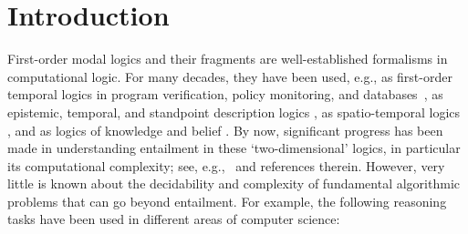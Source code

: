 \documentclass{lmcs} %
\theoremstyle{plain}\newtheorem{satz}[thm]{Satz} %
\begin{document}
\maketitle



\section{Introduction}\label{intro}

First-order modal logics and their fragments are well-established formalisms in computational logic. For many decades, they have been used, e.g., as first-order temporal logics in program verification, policy monitoring, and databases~\cite{DBLP:series/eatcs/Kroger87,DBLP:conf/cav/BasinKM10,DBLP:conf/rv/HavelundP18,DBLP:reference/db/ChomickiT18a}, as epistemic, temporal, and standpoint description logics \cite{DBLP:journals/ai/DoniniLNNS98,DBLP:conf/time/LutzWZ08,DBLP:conf/time/ArtaleKKRWZ17,DBLP:conf/semweb/AlvarezRS22}, as spatio-temporal logics \cite{DBLP:reference/spatial/KontchakovKWZ07}, and as logics of knowledge and belief \cite{DBLP:journals/ai/BelardinelliL09,DBLP:journals/corr/Wang17d,liu_et_al:LIPIcs.MFCS.2022.70,DBLP:journals/apal/WangWS22}. By now, significant progress has been made in understanding entailment in these `two-dimensional' logics, in particular its computational complexity; see, e.g.,~\cite{GabEtAl03,DBLP:journals/tocl/HampsonK15,DBLP:journals/iandc/LiuPRW23,DBLP:journals/tocl/ArtaleMO24} and references therein. However, very little is known about the decidability and complexity of fundamental algorithmic problems that can go beyond entailment. For example, the following reasoning tasks have been used in different areas of computer science:
%
\end{document}
